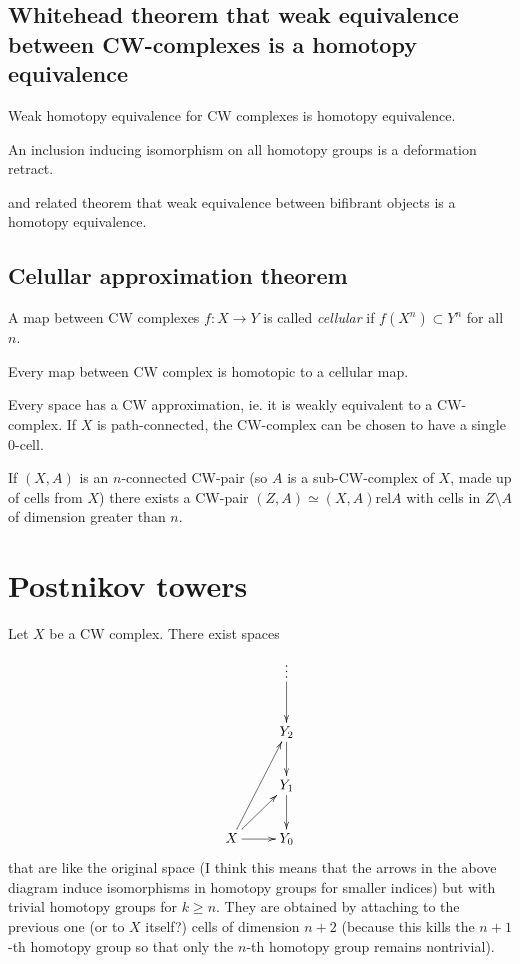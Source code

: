 \subsection{Whitehead theorem that weak equivalence between CW-complexes is a homotopy equivalence}

\begin{theorem}[Whitehead]
	Weak homotopy equivalence for CW complexes is homotopy equivalence.

	An inclusion inducing isomorphism on all homotopy groups is a deformation retract.
\end{theorem}


and related theorem that weak equivalence between bifibrant objects is a homotopy equivalence.
\subsection{Celullar approximation theorem}

\begin{definition}
	A map between CW complexes $f:X\to Y$ is called {\it cellular} if $f(X^{n})\subset Y^{n}$ for all $n$.
\end{definition}
\begin{theorem}
	Every map between CW complex is homotopic to a cellular map.
\end{theorem}
\begin{theorem}[CW approximation]
	Every space has a CW approximation, ie. it is weakly equivalent to a CW-complex.	
	If $X$ is path-connected, the CW-complex can be chosen to have a single 0-cell.

	If $(X,A)$ is an $n$-connected CW-pair (so $A$ is a sub-CW-complex of $X$, made up of cells from $X$) there exists a CW-pair $(Z,A)\simeq (X,A)\text{rel}A$ with cells in $Z\setminus A$ of dimension greater than $n$.
\end{theorem}


\section{Postnikov towers}
Let $X$ be a CW complex. There exist spaces
$$
\xymatrix{
&\vdots\ar[d]\\
&Y_2\ar[d]\\
&Y_1\ar[d]\\
X\ar[uur]\ar[ur]\ar[r]&Y_0
}
$$
that are like the original space
(I think this means that the arrows in the
above diagram induce isomorphisms in
homotopy groups for smaller indices)
but with trivial homotopy groups for $k\geq n$. 
They are obtained by attaching to the previous one 
(or to $X$ itself?) 
cells of dimension $n+2$ 
(because this kills the $n+1$-th homotopy group 
so that only the $n$-th homotopy group remains nontrivial).

